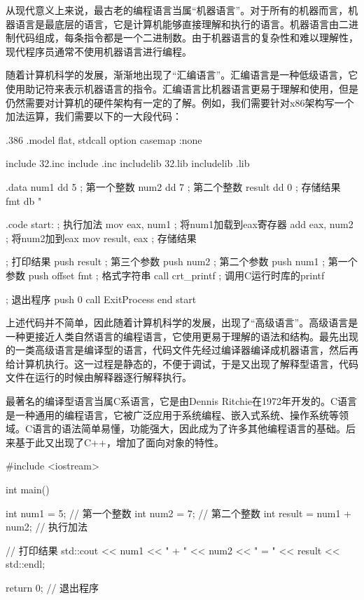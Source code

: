 \documentclass[12pt]{report}
\begin{document}
从现代意义上来说，最古老的编程语言当属“机器语言”。对于所有的机器而言，机器语言是最底层的语言，它是计算机能够直接理解和执行的语言。机器语言由二进制代码组成，每条指令都是一个二进制数。由于机器语言的复杂性和难以理解性，现代程序员通常不使用机器语言进行编程。

随着计算机科学的发展，渐渐地出现了“汇编语言”。汇编语言是一种低级语言，它使用助记符来表示机器语言的指令。汇编语言比机器语言更易于理解和使用，但是仍然需要对计算机的硬件架构有一定的了解。例如，我们需要针对x86架构写一个加法运算，我们需要以下的一大段代码：

\begin{codebox}[title=汇编语言加法运算，Windows，MASM语法]   
    .386
    .model flat, stdcall
    option casemap :none
    
    include 32.inc
    include \msvcrt.inc
    includelib \lib{}32.lib
    includelib \lib\msvcrt.lib
    
    .data
        num1    dd 5          ; 第一个整数
        num2    dd 7          ; 第二个整数
        result  dd 0          ; 存储结果
        fmt     db "%
    
    .code
    start:
        ; 执行加法
        mov eax, num1         ; 将num1加载到eax寄存器
        add eax, num2         ; 将num2加到eax
        mov result, eax       ; 存储结果
        
        ; 打印结果
        push result           ; 第三个参数
        push num2             ; 第二个参数
        push num1             ; 第一个参数
        push offset fmt       ; 格式字符串
        call crt_printf       ; 调用C运行时库的printf
        
        ; 退出程序
        push 0
        call ExitProcess
    end start
\end{codebox}

上述代码并不简单，因此随着计算机科学的发展，出现了“高级语言”。高级语言是一种更接近人类自然语言的编程语言，它使用更易于理解的语法和结构。最先出现的一类高级语言是编译型的语言，代码文件先经过编译器编译成机器语言，然后再给计算机执行。这一过程是静态的，不便于调试，于是又出现了解释型语言，代码文件在运行的时候由解释器逐行解释执行。

最著名的编译型语言当属C系语言，它是由Dennis Ritchie在1972年开发的。C语言是一种通用的编程语言，它被广泛应用于系统编程、嵌入式系统、操作系统等领域。C语言的语法简单易懂，功能强大，因此成为了许多其他编程语言的基础。后来基于此又出现了C++，增加了面向对象的特性。

\begin{codebox}[title=编译型语言加法运算，C++语法]   
    #include <iostream>
    
    int main() {
        int num1 = 5; // 第一个整数
        int num2 = 7; // 第二个整数
        int result = num1 + num2; // 执行加法
        
        // 打印结果
        std::cout << num1 << " + " << num2 << " = " << result << std::endl;
        
        return 0; // 退出程序
    }
\end{codebox}
\end{document}
